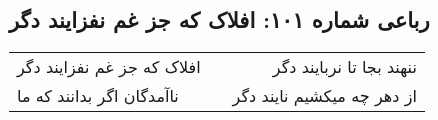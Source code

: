 \begin{center}
\section*{رباعی شماره ۱۰۱: افلاک که جز غم نفزایند دگر}
\label{sec:sh101}
\begin{longtable}{l p{0.5cm} r}
افلاک که جز غم نفزایند دگر
&&
ننهند بجا تا نربایند دگر
\\
ناآمدگان اگر بدانند که ما
&&
از دهر چه میکشیم نایند دگر
\\
\end{longtable}
\end{center}
